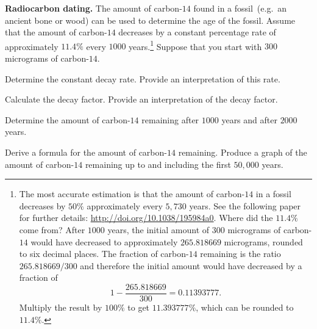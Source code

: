 \documentclass[a4paper,oneside,12pt]{article}
\begin{document}
\begin{example}
\label{eg:radiocarbon_dating}
\textbf{Radiocarbon dating.}
The amount of carbon-$14$ found in a fossil~(e.g.~an ancient bone or
wood) can be used to determine the age of the fossil.  Assume that the
amount of carbon-$14$ decreases by a constant percentage rate of
approximately $11.4\%$ every $1000$ years.\footnote{
  The most accurate estimation is that the amount of carbon-$14$ in a
  fossil decreases by $50\%$ approximately every $5,730$ years.  See
  the following paper for further details:
  \url{http://doi.org/10.1038/195984a0}.  Where did the $11.4\%$ come
  from?  After $1000$ years, the initial amount of $300$ micrograms of
  carbon-$14$ would have decreased to approximately $265.818669$
  micrograms, rounded to six decimal places.  The fraction of
  carbon-$14$ remaining is the ratio $265.818669 / 300$ and therefore
  the initial amount would have decreased by a fraction of
  \[
  1 - \frac{265.818669}{300}
  =
  0.11393777.
  \]
  Multiply the result by $100\%$ to get $11.393777\%$, which can be
  rounded to $11.4\%$.
}
Suppose that you start with $300$ micrograms of carbon-$14$.
\begin{packedenum}
\item\label{subeg:carbon14_decay_rate}
  Determine the constant decay rate.  Provide an interpretation of
  this rate.

\item\label{subeg:carbon14_decay_factor}
  Calculate the decay factor.  Provide an interpretation of the decay
  factor.

\item\label{subeg:carbon14_after_1000_and_2000_years}
  Determine the amount of carbon-$14$ remaining after $1000$ years and
  after $2000$ years.

\item\label{subeg:carbon14_formula_graph}
  Derive a formula for the amount of carbon-$14$ remaining.  Produce a
  graph of the amount of carbon-$14$ remaining up to and including the
  first $50,000$ years.
\end{packedenum}
\end{example}
\end{document}

